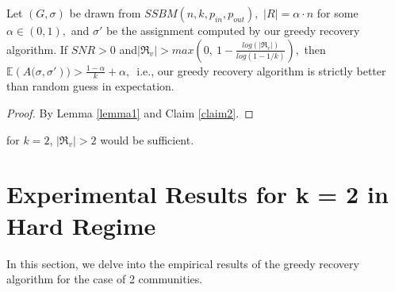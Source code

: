 \begin{corollary}
     Let $(G, \sigma)$ be drawn from $SSBM(n, k, p_{in}, p_{out}),$ $|R|=\alpha\cdot n$ for some $\alpha\in(0,1),$ and $\sigma'$ be the assignment computed by our greedy recovery algorithm. If $SNR>0$ and$|\Re_v|>max(0,~1-\frac{log(|\Re_v|)}{log(1-1/k)}),$ then $\mathbb{E}({A(\sigma, \sigma'}))>\frac{1-\alpha}{k}+\alpha,$~i.e., our greedy recovery algorithm is strictly better than random guess in expectation.
\end{corollary}
\begin{proof}
    By Lemma \ref{lemma1} and Claim \ref{claim2}.
\end{proof}
\begin{remark}
    for $k=2$, $|\Re_v|>2$ would be sufficient.
\end{remark}
\section{Experimental Results for k = 2 in Hard Regime}
In this section, we delve into the empirical results of the greedy recovery algorithm for the case of 2 communities.
